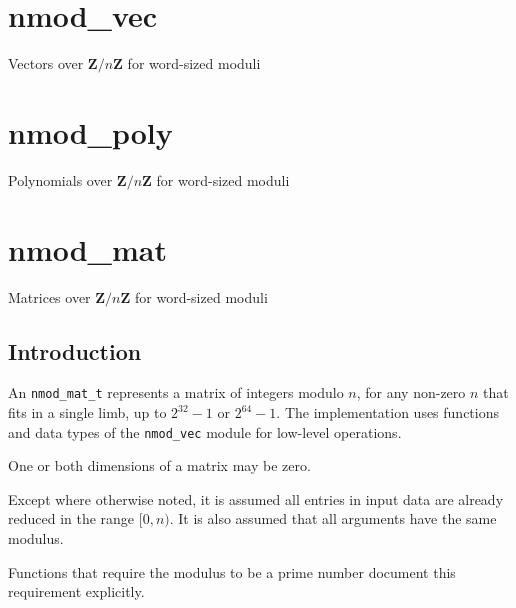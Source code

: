 \documentclass[a4paper,10pt]{book}
\newcommand{\Z}{\mathbf{Z}}%
\newcommand{\code}{\lstinline}
\begin{document}
\chapter{nmod\_vec}
\epigraph{Vectors over $\Z / n \Z$ for word-sized moduli}{}




\chapter{nmod\_poly}
\epigraph{Polynomials over $\Z / n \Z$ for word-sized moduli}{}




\chapter{nmod\_mat}
\epigraph{Matrices over $\Z / n \Z$ for word-sized moduli}{}

\section{Introduction}

An \code{nmod_mat_t} represents a matrix of integers modulo $n$, for any 
non-zero $n$ that fits in a single limb, up to $2^{32}-1$ or $2^{64}-1$. The
implementation uses functions and data types of the \code{nmod_vec} module
for low-level operations.

One or both dimensions of a matrix may be zero.

Except where otherwise noted, it is assumed all entries in input
data are already reduced in the range $[0, n)$. It is also assumed that
all arguments have the same modulus.

Functions that require the modulus to be a prime number document this
requirement explicitly.



\end{document}
